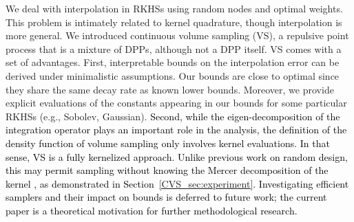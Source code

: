 \documentclass[twoside,11pt]{book}
\newcommand{\rev}[1]{\textcolor{black}{#1}}
\numberwithin{theorem}{chapter}
\numberwithin{definition}{chapter}
\numberwithin{proposition}{chapter}
\numberwithin{corollary}{chapter}
\numberwithin{example}{chapter}
\numberwithin{lemma}{chapter}
\numberwithin{assumption}{chapter}
\numberwithin{equation}{chapter}
\numberwithin{figure}{chapter}
\DeclareMathOperator{\X}{\mathcal{X}}
\begin{document}






We deal with interpolation in RKHSs using random nodes and optimal weights. This problem is intimately related to kernel quadrature, though interpolation is more general.
We introduced continuous volume sampling (VS), a repulsive point process that is a mixture of DPPs, although not a DPP itself.
VS comes with a set of advantages. First, interpretable bounds on the interpolation error can be derived under minimalistic assumptions. Our bounds are close to optimal since they share the same decay rate as known lower bounds. Moreover, we provide explicit evaluations of the constants appearing in our bounds for some particular RKHSs (e.g., Sobolev, Gaussian).
\rev{
Second, while the eigen-decomposition of the integration operator plays an important role in the analysis, the definition of the density function of volume sampling only involves kernel evaluations. In that sense, VS is a fully kernelized approach. Unlike previous work on random design, this may permit sampling without knowing the Mercer decomposition of the kernel \citep{ReGh19}, as demonstrated in Section~\ref{CVS_sec:experiment}. Investigating efficient samplers and their impact on bounds is deferred to future work; the current paper is a theoretical motivation for further methodological research.
}
\end{document}
